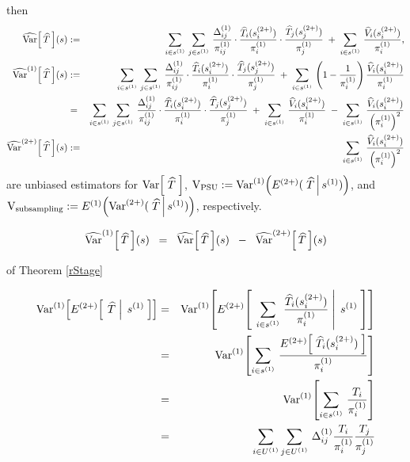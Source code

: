 \begin{theorem}
then
\begin{eqnarray*}
\widehat{\textnormal{Var}}\!\left[\,\widehat{T}\,\right]\!(s)
&:=&
\sum_{i\in s^{(1)}}\,\sum_{j\in s^{(1)}}\,
\dfrac{\Delta^{(1)}_{ij}}{\pi^{(1)}_{ij}}
\cdot
\dfrac{\widehat{T}_{i}(s^{(2+)}_{i})}{\pi^{(1)}_{i}}
\cdot
\dfrac{\widehat{T}_{j}(s^{(2+)}_{j})}{\pi^{(1)}_{j}}
\;+\;
\sum_{i\in s^{(1)}}\,\dfrac{\widehat{V}_{i}(s^{(2+)}_{i})}{\pi^{(1)}_{i}},
\\
\widehat{\textnormal{Var}}^{(1)}\!\left[\,\widehat{T}\,\right]\!(s)
&:=&
\sum_{i\in s^{(1)}}\,\sum_{j\in s^{(1)}}\,
\dfrac{\Delta^{(1)}_{ij}}{\pi^{(1)}_{ij}}
\cdot
\dfrac{\widehat{T}_{i}(s^{(2+)}_{i})}{\pi^{(1)}_{i}}
\cdot
\dfrac{\widehat{T}_{j}(s^{(2+)}_{j})}{\pi^{(1)}_{j}}
\;+\;
\sum_{i\in s^{(1)}}\,\left(1 - \dfrac{1}{\pi^{(1)}_{i}}\right)\dfrac{\widehat{V}_{i}(s^{(2+)}_{i})}{\pi^{(1)}_{i}}
\\
&=&
\sum_{i\in s^{(1)}}\,\sum_{j\in s^{(1)}}\,
\dfrac{\Delta^{(1)}_{ij}}{\pi^{(1)}_{ij}}
\cdot
\dfrac{\widehat{T}_{i}(s^{(2+)}_{i})}{\pi^{(1)}_{i}}
\cdot
\dfrac{\widehat{T}_{j}(s^{(2+)}_{j})}{\pi^{(1)}_{j}}
\;+\;
\sum_{i\in s^{(1)}}\,\dfrac{\widehat{V}_{i}(s^{(2+)}_{i})}{\pi^{(1)}_{i}}
\;-\;
\sum_{i\in s^{(1)}}\,\dfrac{\widehat{V}_{i}(s^{(2+)}_{i})}{\left(\pi^{(1)}_{i}\right)^{2}}
\\
\widehat{\textnormal{Var}}^{(2+)}\!\left[\,\widehat{T}\,\right]\!(s)
&:=&
\sum_{i\in s^{(1)}}\,\dfrac{\widehat{V}_{i}(s^{(2+)}_{i})}{\left(\pi^{(1)}_{i}\right)^{2}}
\end{eqnarray*}
are unbiased estimators for
$\textnormal{Var}\!\left[\;\widehat{T}\;\right]$,\;
$\textnormal{V}_{\textnormal{PSU}} := \textnormal{Var}^{(1)}\!\left(E^{(2+)}(\,\left.\widehat{T}\,\right\vert s^{(1)})\right)$,
and\;
$\textnormal{V}_{\textnormal{subsampling}} := E^{(1)}\!\left(\textnormal{Var}^{(2+)}(\,\left.\widehat{T}\,\right\vert s^{(1)})\right)$,
respectively.
\end{theorem}

\begin{corollary}
\begin{equation}
\widehat{\textnormal{Var}}^{(1)}\!\left[\,\widehat{T}\,\right]\!(s)
\;\;=\;\;
\widehat{\textnormal{Var}}\!\left[\,\widehat{T}\,\right]\!(s)
\;\;-\;\;
\widehat{\textnormal{Var}}^{(2+)}\!\left[\,\widehat{T}\,\right]\!(s)
\end{equation}
\end{corollary}

\proof\!\!\!\!\!\!of Theorem \ref{rStage}

\begin{eqnarray*}
\textnormal{Var}^{(1)}\!\left[E^{(2+)}\!\left[\;\left.\widehat{T}\;\right\vert\;s^{(1)}\;\right]\right]
&=&
\textnormal{Var}^{(1)}\!\left[E^{(2+)}\!\left[\;\left.
\sum_{i\in s^{(1)}}\,\frac{\widehat{T}_{i}(s^{(2+)}_{i})}{\pi^{(1)}_{i}}
\;\right\vert\;s^{(1)}\;\right]\right]
\\
&=&
\textnormal{Var}^{(1)}\!\left[\sum_{i\in s^{(1)}}\,
\frac{E^{(2+)}\!\left[\;\widehat{T}_{i}(s^{(2+)}_{i})\;\right]}{\pi^{(1)}_{i}}
\right]
\\
&=&
\textnormal{Var}^{(1)}\!\left[\sum_{i\in s^{(1)}}\,\frac{T_{i}}{\pi^{(1)}_{i}}\right]
\\
&=&
\sum_{i\in U^{(1)}}\sum_{j\in U^{(1)}}\,\Delta^{(1)}_{ij}\frac{T_{i}}{\pi^{(1)}_{i}}\frac{T_{j}}{\pi^{(1)}_{j}}
\end{eqnarray*}

